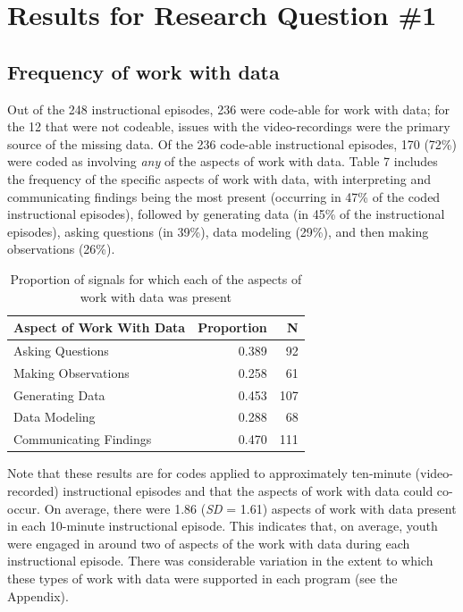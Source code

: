 \documentclass[]{book}
\theoremstyle{definition}
\theoremstyle{definition}
\theoremstyle{definition}
\theoremstyle{remark}
\begin{document}
\section{Results for Research Question
\#1}\label{results-for-research-question-1}

\subsection{Frequency of work with
data}\label{frequency-of-work-with-data}

Out of the 248 instructional episodes, 236 were code-able for work with
data; for the 12 that were not codeable, issues with the
video-recordings were the primary source of the missing data. Of the 236
code-able instructional episodes, 170 (72\%) were coded as involving
\emph{any} of the aspects of work with data. Table 7 includes the
frequency of the specific aspects of work with data, with interpreting
and communicating findings being the most present (occurring in 47\% of
the coded instructional episodes), followed by generating data (in 45\%
of the instructional episodes), asking questions (in 39\%), data
modeling (29\%), and then making observations (26\%).

\begin{table}

\caption{\label{tab:unnamed-chunk-9}Proportion of signals for which each of the aspects of work with data was present}
\centering
\begin{tabular}[t]{lrr}
\toprule
Aspect of Work With Data & Proportion & N\\
\midrule
Asking Questions & 0.389 & 92\\
Making Observations & 0.258 & 61\\
Generating Data & 0.453 & 107\\
Data Modeling & 0.288 & 68\\
Communicating Findings & 0.470 & 111\\
\bottomrule
\end{tabular}
\end{table}

Note that these results are for codes applied to approximately
ten-minute (video-recorded) instructional episodes and that the aspects
of work with data could co-occur. On average, there were 1.86 (\emph{SD}
= 1.61) aspects of work with data present in each 10-minute
instructional episode. This indicates that, on average, youth were
engaged in around two of aspects of the work with data during each
instructional episode. There was considerable variation in the extent to
which these types of work with data were supported in each program (see
the Appendix).
\end{document}
